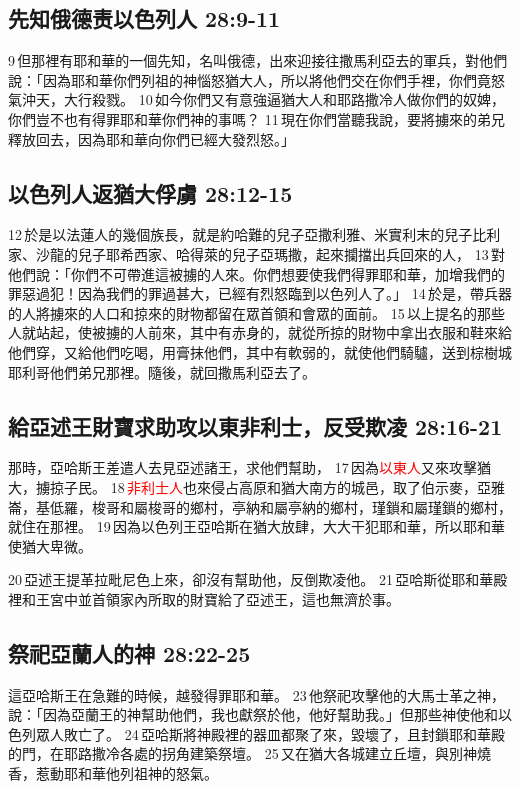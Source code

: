 \subsection{先知俄德责以色列人 28:9-11}
 9 但那裡有耶和華的一個先知，名叫俄德，出來迎接往撒馬利亞去的軍兵，對他們說：「因為耶和華你們列祖的神惱怒猶大人，所以將他們交在你們手裡，你們竟怒氣沖天，大行殺戮。 10 如今你們又有意強逼猶大人和耶路撒冷人做你們的奴婢，你們豈不也有得罪耶和華你們神的事嗎？ 11 現在你們當聽我說，要將擄來的弟兄釋放回去，因為耶和華向你們已經大發烈怒。」 

\subsection{以色列人返猶大俘虜 28:12-15}
12 於是以法蓮人的幾個族長，就是約哈難的兒子亞撒利雅、米實利末的兒子比利家、沙龍的兒子耶希西家、哈得萊的兒子亞瑪撒，起來攔擋出兵回來的人， 13 對他們說：「你們不可帶進這被擄的人來。你們想要使我們得罪耶和華，加增我們的罪惡過犯！因為我們的罪過甚大，已經有烈怒臨到以色列人了。」 14 於是，帶兵器的人將擄來的人口和掠來的財物都留在眾首領和會眾的面前。 15 以上提名的那些人就站起，使被擄的人前來，其中有赤身的，就從所掠的財物中拿出衣服和鞋來給他們穿，又給他們吃喝，用膏抹他們，其中有軟弱的，就使他們騎驢，送到棕樹城耶利哥他們弟兄那裡。隨後，就回撒馬利亞去了。


\subsection{給亞述王財寶求助攻以東非利士，反受欺凌 28:16-21}
那時，亞哈斯王差遣人去見亞述諸王，求他們幫助， 17 因為\textcolor{red}{以東人}又來攻擊猶大，擄掠子民。 18 \textcolor{red}{非利士人}也來侵占高原和猶大南方的城邑，取了伯示麥，亞雅崙，基低羅，梭哥和屬梭哥的鄉村，亭納和屬亭納的鄉村，瑾鎖和屬瑾鎖的鄉村，就住在那裡。 19 因為以色列王亞哈斯在猶大放肆，大大干犯耶和華，所以耶和華使猶大卑微。

 20 亞述王提革拉毗尼色上來，卻沒有幫助他，反倒欺凌他。 21 亞哈斯從耶和華殿裡和王宮中並首領家內所取的財寶給了亞述王，這也無濟於事。


\subsection{祭祀亞蘭人的神 28:22-25}
這亞哈斯王在急難的時候，越發得罪耶和華。 23 他祭祀攻擊他的大馬士革之神，說：「因為亞蘭王的神幫助他們，我也獻祭於他，他好幫助我。」但那些神使他和以色列眾人敗亡了。 24 亞哈斯將神殿裡的器皿都聚了來，毀壞了，且封鎖耶和華殿的門，在耶路撒冷各處的拐角建築祭壇。 25 又在猶大各城建立丘壇，與別神燒香，惹動耶和華他列祖神的怒氣。


